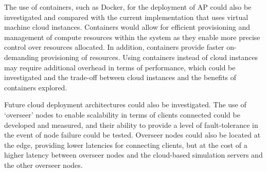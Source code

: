 

The use of containers, such as Docker, for the deployment of AP could also be investigated and compared with the current implementation that uses virtual machine cloud instances. Containers would allow for efficient provisioning and management of compute resources within the system as they enable more precise control over resources allocated. In addition, containers provide faster on-demanding provisioning of resources. Using containers instead of cloud instances may require additional overhead in terms of performance, which could be investigated and the trade-off between cloud instances and the benefits of containers explored.

Future cloud deployment architectures could also be investigated. The use of `overseer' nodes to enable scalability in terms of clients connected could be developed and measured, and their ability to provide a level of fault-tolerance in the event of node failure could be tested. Overseer nodes could also be located at the edge, providing lower latencies for connecting clients, but at the cost of a higher latency between overseer nodes and the cloud-based simulation servers and the other overseer nodes.

